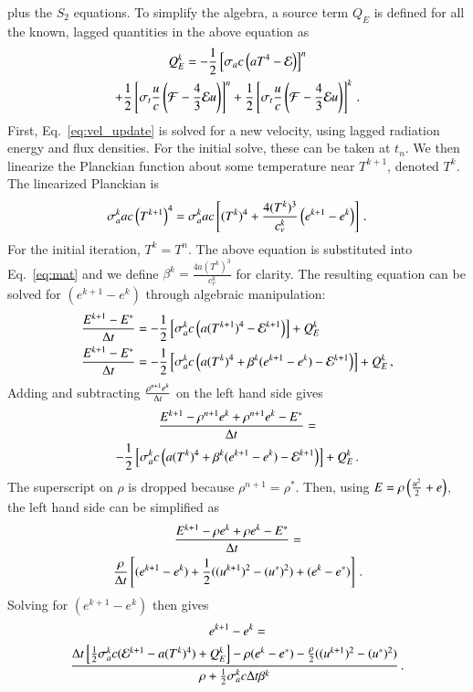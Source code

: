 plus the $S_2$ equations.  To simplify the algebra, a source term $Q_E$ is
defined for all the known, lagged quantities in the above equation as
\begin{multline}
   Q_E^{k} = -\frac{1}{2}\left[\sigma_a c\left( aT^4 - \mathcal{E}\right)\right]^n\\
   +\frac{1}{2}\left[\sigma_t \frac{u}{c} \left( \mathcal{F} - \frac{4}{3} \mathcal{E} u \right)\right]^n + \frac{1}{2}\left[\sigma_t \frac{u}{c} \left( \mathcal{F} - \frac{4}{3} \mathcal{E} u \right)\right]^k \, .
\end{multline}
First, Eq.~\eqref{eq:vel_update} is solved for a new velocity, using lagged
radiation energy and flux densities.  For the initial solve, these can be taken
at $t_n$.  We then linearize the Planckian function about some temperature near
$T^{k+1}$, denoted $T^k$. The linearized Planckian is
\begin{equation}
  \sigma_a^k a c \left( T^{k+1} \right)^4 = 
  \sigma_a^k a c \left[(T^k)^4 + \frac{4(T^k)^3}{c_v^k}\left(
  e^{k+1} - e^{k}  \right)\right] \, .
    \label{eq:linearize}
\end{equation}
For the initial iteration, $T^k=T^n$.  The above equation is substituted into
Eq.~\eqref{eq:mat} and we define $\beta^k=\frac{4a(T^k)^3}{c_v^k}$ for clarity.
The resulting equation can be solved for $(e^{k+1} - e^{k})$ through
algebraic manipulation:
\begin{align*}
   \frac{E^{k+1} - E^*}{\Delta t} &= - \frac{1}{2}\left[\sigma_a^k c \left(
   a(T^{k+1})^4 - \mathcal{E}^{k+1}\right)\right]+Q_E^k \\
   \frac{E^{k+1} - E^*}{\Delta t} &= - \frac{1}{2}\left[\sigma_a^k c \left(
   a(T^k)^4 + \beta^k(e^{k+1} - e^k)  - \mathcal{E}^{k+1}\right)\right]+Q_E^k \, ,
\end{align*}
Adding and subtracting $\frac{\rho^{n+1}e^k}{\Delta t}$ on the left hand side gives
\begin{multline*}
   \frac{E^{k+1}-\rho^{n+1} e^k + \rho^{n+1} e^k - E^*}{\Delta t} = \\
   -\frac{1}{2}\left[\sigma_a^{k}c\left(
   a(T^k)^4 + \beta^k(e^{k+1} - e^k)  - \mathcal{E}^{k+1}\right)\right]+Q_E^k \, .
\end{multline*}
The superscript on $\rho$ is dropped because $\rho^{n+1} = \rho^*$. Then, using
$E=\rho\left( \frac{u^2}{2} + e \right)$, the left hand side can be simplified as 
\begin{multline} 
   \frac{E^{k+1} - \rho e^k + \rho e^k - E^*}{\Delta t} =\\
   \frac{\rho}{\Delta t}\left[(e^{k+1} - e^{k}) + \frac{1}{2}((u^{k+1})^2-(u^*)^2) +
   (e^k-e^*) \right] \, .
\end{multline}
Solving for $(e^{k+1} - e^{k})$ then gives
\begin{multline}
    e^{k+1}-e^k=\\
    \frac{{\Delta t}\left[ \frac{1}{2}\sigma_a^k c (\mathcal{E}^{k+1} -
    a(T^k)^4)+Q_E^k \right]- \rho(e^k-e^*)-
    \frac{\rho}{2}((u^{k+1})^2-(u^*)^2)}
    {\rho +\frac{1}{2}\sigma_a^k c \Delta t\beta^k} \, .
\label{eq:energy_update}
\end{multline}
